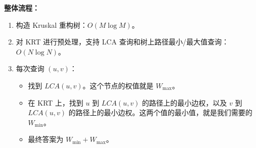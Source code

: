 \documentclass[11pt]{beamer}
\begin{document}
\begin{frame}
    \textbf{整体流程：}
    \begin{enumerate}
        \item 构造 Kruskal 重构树：$O(M \log M)$。
        \item 对 KRT 进行预处理，支持 LCA 查询和树上路径最小/最大值查询：$O(N \log N)$。
        \item 每次查询 $(u, v)$：
        \begin{itemize}
            \item 找到 $LCA(u, v)$。这个节点的权值就是 $W_{\max}$。
            \item 在 KRT 上，找到 $u$ 到 $LCA(u, v)$ 的路径上的最小边权，以及 $v$ 到 $LCA(u, v)$ 的路径上的最小边权。这两个值的最小值，就是我们需要的 $W_{\min}$。
            \item 最终答案为 $W_{\min} + W_{\max}$。
        \end{itemize}
    \end{enumerate}
\end{frame}
\end{document}
